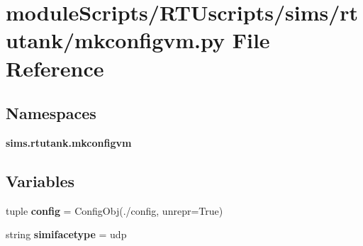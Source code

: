 \section{module\+Scripts/\+R\+T\+Uscripts/sims/rtutank/mkconfigvm.py File Reference}
\label{rtutank_2mkconfigvm_8py}
\subsection*{Namespaces}
\begin{DoxyCompactItemize}
\item 
 {\bf sims.\+rtutank.\+mkconfigvm}
\end{DoxyCompactItemize}
\subsection*{Variables}
\begin{DoxyCompactItemize}
\item 
tuple {\bf config} = Config\+Obj(\textquotesingle{}./config\textquotesingle{}, unrepr=True)
\item 
string {\bf simifacetype} = \textquotesingle{}udp\textquotesingle{}
\end{DoxyCompactItemize}
